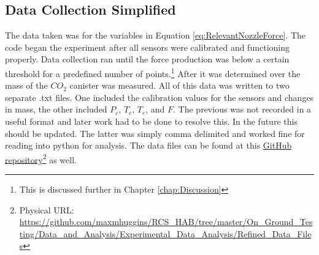 \subsection{Data Collection Simplified}
The data taken was for the variables in Equation \ref{eq:RelevantNozzleForce}. The code began the experiment after all sensors were calibrated and functioning properly. Data collection ran until the force production was below a certain threshold for a predefined number of points.\footnote{This is discussed further in Chapter \ref{chap:Discussion}} After it was determined over the mass of the $CO_2$ canister was measured. All of this data was written to two separate .txt files. One included the calibration values for the sensors and changes in mass, the other included $P_c$, $T_c$, $T_e$, and $F$. The previous was not recorded in a useful format and later work had to be done to resolve this. In the future this should be updated. The latter was simply comma delimited and worked fine for reading into python for analysis. The data files can be found at this \href{https://github.com/maxmhuggins/RCS_HAB/tree/master/On_Ground_Testing/Data_and_Analysis/Experimental_Data_Analysis/Refined_Data_Files}{GitHub repository}\footnote{Physical URL: \url{https://github.com/maxmhuggins/RCS_HAB/tree/master/On_Ground_Testing/Data_and_Analysis/Experimental_Data_Analysis/Refined_Data_Files}} as well.